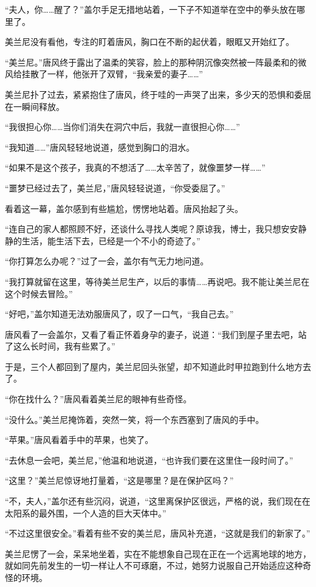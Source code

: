 “夫人，你……醒了？”盖尔手足无措地站着，一下子不知道举在空中的拳头放在哪里了。

美兰尼没有看他，专注的盯着唐风，胸口在不断的起伏着，眼眶又开始红了。

“美兰尼。”唐风终于露出了温柔的笑容，脸上的那种阴沉像突然被一阵最柔和的微风给挂散了一样，他张开了双臂，“我亲爱的妻子……”

美兰尼扑了过去，紧紧抱住了唐风，终于哇的一声哭了出来，多少天的恐惧和委屈在一瞬间释放。

“我很担心你……当你们消失在洞穴中后，我就一直很担心你……”

“我知道……”唐风轻轻地说道，感觉到胸口的泪水。

“如果不是这个孩子，我真的不想活了……太辛苦了，就像噩梦一样……”

“噩梦已经过去了，美兰尼，”唐风轻轻说道，“你受委屈了。”

看着这一幕，盖尔感到有些尴尬，愣愣地站着。唐风抬起了头。

“连自己的家人都照顾不好，还谈什么寻找人类呢？原谅我，博士，我只想安安静静的生活，能生活下去，已经是一个不小的奇迹了。”

“你打算怎么办呢？”过了一会，盖尔有气无力地问道。

“我打算就留在这里，等待美兰尼生产，以后的事情……再说吧。我不能让美兰尼在这个时候去冒险。”

“好吧，”盖尔知道无法劝服唐风了，叹了一口气，“我自己去。”

唐风看了一会盖尔，又看了看正怀着身孕的妻子，说道：“我们到屋子里去吧，站了这么长时间，我有些累了。”

于是，三个人都回到了屋内，美兰尼回头张望，却不知道此时甲拉跑到什么地方去了。

“你在找什么？”唐风看着美兰尼的眼神有些奇怪。

“没什么。”美兰尼掩饰着，突然一笑，将一个东西塞到了唐风的手中。

“苹果。”唐风看着手中的苹果，也笑了。

“去休息一会吧，美兰尼，”他温和地说道，“也许我们要在这里住一段时间了。”

“这里？”美兰尼惊讶地打量着，“这是哪里？是在保护区吗？”

“不，夫人，”盖尔还有些沉闷，说道，“这里离保护区很远，严格的说，我们现在在太阳系的最外围，一个人造的巨大天体中。”

“不过这里很安全。”看着有些不安的美兰尼，唐风补充道，“这就是我们的新家了。”

美兰尼愣了一会，呆呆地坐着，实在不能想象自己现在正在一个远离地球的地方，就如同先前发生的一切一样让人不可琢磨，不过，她努力说服自己开始适应这种奇怪的环境。

